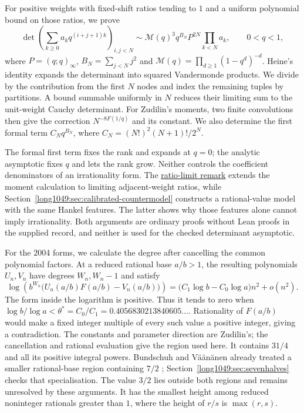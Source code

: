 For positive weights with fixed-shift ratios tending to $1$ and a
uniform polynomial bound on those ratios, we prove
\[
 \det\left(\sum_{k\ge0}a_kq^{(i+j+1)k}\right)_{i,j<N}
 \sim\mathcal M(q)^3q^{B_N}P^{2N}\prod_{k<N}a_k,
 \qquad 0<q<1,
\]
where $P=(q;q)_\infty$, $B_N=\sum_{j<N}j^2$ and
$\mathcal M(q)=\prod_{d\ge1}(1-q^d)^{-d}$.
Heine's identity expands the determinant into squared Vandermonde
products. We divide by the contribution from the first $N$ nodes
and index the remaining tuples by partitions. A bound summable
uniformly in $N$ reduces their limiting sum to the unit-weight
Cauchy determinant. For Zudilin's moments, two finite convolutions
then give the correction $N^{-8F(1/q)}$ and its constant.
We also determine the first formal term $C_Nq^{B_N}$, where
$C_N=(N!)^2(N+1)!/2^N$.

The formal first term fixes the rank and expands at $q=0$;
the analytic asymptotic fixes $q$ and lets the rank grow. Neither
controls the coefficient denominators of an irrationality form.
The \hyperref[long1049:thm:geometric-ratio]{ratio-limit remark}
extends the moment calculation to limiting adjacent-weight ratios,
while Section~\ref{long1049:sec:calibrated-countermodel} constructs
a rational-value model with the same Hankel features. The latter
shows why those features alone cannot imply irrationality. Both
arguments are ordinary proofs without Lean proofs in the supplied
record, and neither is used for the checked determinant asymptotic.

For the 2004 forms, we calculate the degree after cancelling the
common polynomial factors. At a reduced rational base $a/b>1$,
the resulting polynomials $U_n,V_n$ have degrees $W_n,W_n-1$ and
satisfy
\[
 \log\!\left(b^{W_n}\bigl(U_n(a/b)F(a/b)-V_n(a/b)\bigr)\right)
 =\bigl(C_1\log b-C_0\log a\bigr)n^2+o(n^2).
\]
The form inside the logarithm is positive. Thus it tends to zero
when $\log b/\log a<\theta^*=C_0/C_1
=0.4056830213840605\ldots$. Rationality of $F(a/b)$ would make a
fixed integer multiple of every such value a positive integer,
giving a contradiction. The constants and parameter direction are
Zudilin's; the cancellation and rational evaluation give the region
used here. It contains $31/4$ and all its positive integral powers.
Bundschuh and V\"a\"an\"anen already treated a smaller rational-base
region containing $7/2$ \cite[Theorem~2, p.~177]{bv1994};
Section~\ref{long1049:sec:sevenhalves} checks that specialisation.
The value $3/2$
lies outside both regions and remains unresolved by these arguments.
It has the smallest height among reduced noninteger rationals
greater than $1$, where the height of $r/s$ is $\max(r,s)$.

